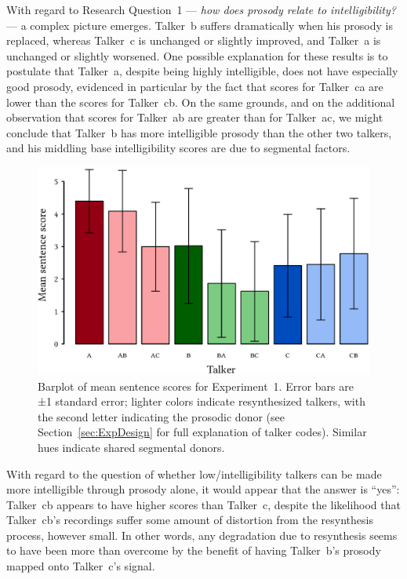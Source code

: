 With regard to Research Question~1 — \emph{how does prosody relate to intelligibility?} — a complex picture emerges.  Talker~\ac{b} suffers dramatically when his prosody is replaced, whereas Talker~\ac{c} is unchanged or slightly improved, and Talker~\ac{a} is unchanged or slightly worsened.  One possible explanation for these results is to postulate that Talker~\ac{a}, despite being highly intelligible, does not have especially good prosody, evidenced in particular by the fact that scores for Talker~\ac{ca} are lower than the scores for Talker~\ac{cb}.  On the same grounds, and on the additional observation that scores for Talker~\ac{ab} are greater than for Talker~\ac{ac}, we might conclude that Talker~\ac{b} has more intelligible prosody than the other two talkers, and his middling base intelligibility scores are due to segmental factors.

\begin{figure}
	\begin{centering}
	\includegraphics{figures/results/ExpOneBarplot.eps}
	\caption[Barplot of mean sentence scores for Experiment~1]{Barplot of mean sentence scores for Experiment~1.  Error bars are ±1 standard error; lighter colors indicate resynthesized talkers, with the second letter indicating the prosodic donor (see Section~\ref{sec:ExpDesign} for full explanation of talker codes).  Similar hues indicate shared segmental donors.\label{fig:ExpOneBarplot}}
	\end{centering}
\end{figure}

With regard to the question of whether low\-/intelligibility talkers can be made more intelligible through prosody alone, it would appear that the answer is “yes”: Talker~\ac{cb} appears to have higher scores than Talker~\ac{c}, despite the likelihood that Talker~\ac{cb}’s recordings suffer some amount of distortion from the resynthesis process, however small.  In other words, any degradation due to resynthesis seems to have been more than overcome by the benefit of having Talker~\ac{b}’s prosody mapped onto Talker~\ac{c}’s signal.

